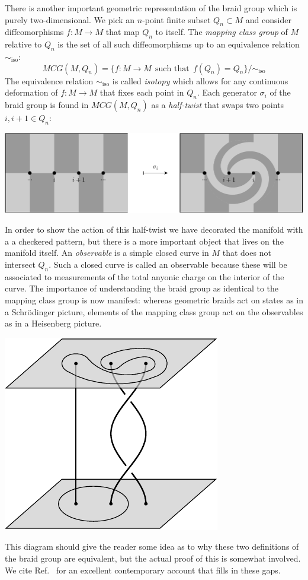 \documentclass[aps, tightenlines, letterpaper, onecolumn, superscriptaddress, notitlepage, 11pt, groupedaddress]{revtex4-1}
\begin{document}
There is another important geometric representation of
the braid group which is purely two-dimensional.
We pick an $n$-point finite subset $Q_n \subset M$
and consider diffeomorphisms 
$f : M \to M$
that map $Q_n$ to itself.
The \emph{mapping class group} of $M$ relative to $Q_n$
is the set of all such diffeomorphisms up to an equivalence relation $\sim_{\mbox{iso}}$:
$$
    MCG(M, Q_n) = \{ f : M \to M \ \ \mbox{such that}\ \ f(Q_n)=Q_n \} / \sim_{\mbox{iso}}
$$
The equivalence relation $\sim_{\mbox{iso}}$ is called \emph{isotopy}
which allows for any continuous deformation of $f:M\to M$ that
fixes each point in $Q_n.$
Each generator $\sigma_i$ of the braid group is found in $MCG(M, Q_n)$
as a \emph{half-twist} that swaps two points $i, i+1 \in Q_n$:
\begin{center}
\includegraphics[width=1.0\columnwidth]{pic-halftwist.pdf}
\end{center}
In order to show
the action of
this half-twist we have 
decorated the manifold with
a a checkered pattern,
but there is a more important
object that lives on the manifold
itself.
An \emph{observable} is a simple
closed curve in $M$ that does
not intersect $Q_n.$
Such a closed curve is called an
observable because these will be
associated to measurements
of the total anyonic charge on the
interior of the curve.
The importance of understanding the
braid group as identical to the mapping class group
is now manifest:
whereas geometric braids act on states
as in a Schr\"{o}dinger picture,
elements of the mapping class group
act on the observables as in
a Heisenberg picture.
\begin{center}
\includegraphics[]{pic-heisenberg.pdf}
\end{center}
This diagram should give the reader some idea as
to why these two definitions of the braid group are
equivalent, but the actual proof of this is somewhat involved.
We cite Ref.~\cite{Kassel2010} for an excellent contemporary
account that fills in these gaps.
\end{document}
